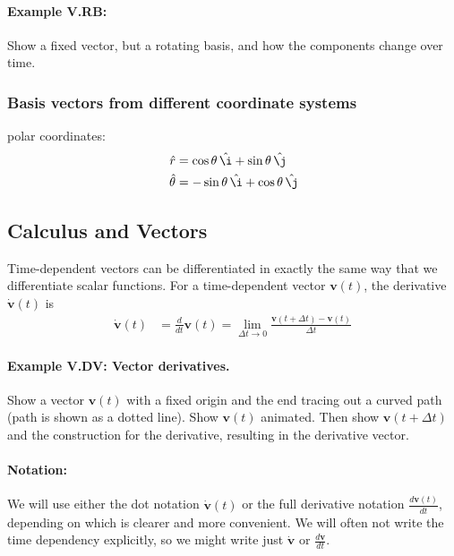 \documentclass{article}
\renewcommand{\vec}[1]{\boldsymbol{#1}}
\newcommand{\unit}[1]{\,\hat{#1}}
\begin{document}
\paragraph{Example V.RB:} Show a fixed vector, but a rotating basis,
and how the components change over time.

\subsubsection{Basis vectors from different coordinate systems}

polar coordinates:
\begin{align}
  \unit{r} &= \cos\theta \unit{\i} + \sin\theta \unit{\j} \\
  \unit{\theta} &= - \sin\theta \unit{\i} + \cos\theta \unit{\j}
\end{align}

\subsection{Calculus and Vectors}

Time-dependent vectors can be differentiated in exactly the same way
that we differentiate scalar functions. For a time-dependent vector
$\vec{v}(t)$, the derivative $\dot{\vec{v}}(t)$ is
\begin{align}
  \dot{\vec{v}}(t) &= \frac{d}{dt} \vec{v}(t)
  = \lim_{\Delta t \to 0}
  \frac{\vec{v}(t + \Delta t) - \vec{v}(t)}{\Delta t}
\end{align}

\paragraph{Example V.DV: Vector derivatives.} Show a vector $\vec{v}(t)$
with a fixed origin and the end tracing out a curved path (path is
shown as a dotted line). Show $\vec{v}(t)$ animated. Then show
$\vec{v}(t + \Delta t)$ and the construction for the derivative,
resulting in the derivative vector.

\paragraph{Notation:} We will use either the dot notation
$\dot{\vec{v}}(t)$ or the full derivative notation
$\frac{d\vec{v}(t)}{dt}$, depending on which is clearer and more
convenient. We will often not write the time dependency explicitly, so
we might write just $\dot{\vec{v}}$ or $\frac{d\vec{v}}{dt}$.
\end{document}
